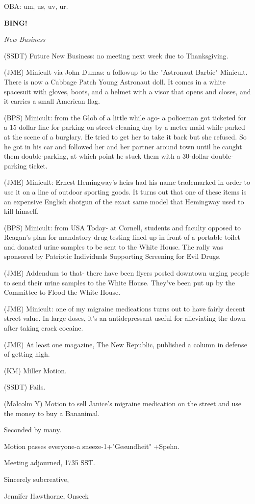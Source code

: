 \documentclass[12pt]{article}
\newcommand{\bing}{{\bf BING!} }
\newcommand{\goto}[1]{\bing \vskip 12pt \centerline{{\em{#1}}}}
\begin{document}
OBA: um, us, uv, ur.

\goto{New Business}

(SSDT) Future New Business: no meeting next week due to Thanksgiving.

(JME) Minicult via John Dumas: a followup to the "Astronaut Barbie" Minicult. There is now a Cabbage Patch Young Astronaut doll. It comes in a white spacesuit with gloves, boots, and a helmet with a visor that opens and closes, and it carries a small American flag.

(BPS) Minicult: from the Glob of a little while ago- a policeman got ticketed for a 15-dollar fine for parking on street-cleaning day by a meter maid while parked at the scene of a burglary. He tried to get her to take it back but she refused. So he got in his car and followed her and her partner around town until he caught them double-parking, at which point he stuck them with a 30-dollar double-parking ticket.

(JME) Minicult: Ernest Hemingway's heirs had his name trademarked in order to use it on a line of outdoor sporting goods. It turns out that one of these items is an expensive English shotgun of the exact same model that Hemingway used to kill himself.

(BPS) Minicult: from USA Today- at Cornell, students and faculty opposed to Reagan's plan for mandatory drug testing lined up in front of a portable toilet and donated urine samples to be sent to the White House. The rally was sponsored by Patriotic Individuals Supporting Screening for Evil Drugs.

(JME) Addendum to that- there have been flyers posted downtown urging people to send their urine samples to the White House. They've been put up by the Committee to Flood the White House.

(JME) Minicult: one of my migraine medications turns out to have fairly decent street value. In large doses, it's an antidepressant useful for alleviating the down after taking crack cocaine.

(JME) At least one magazine, The New Republic, published a column in defense of getting high.

(KM) Miller Motion.

(SSDT) Fails.

(Malcolm Y) Motion to sell Janice's migraine medication on the street and use the money to buy a Bananimal.

Seconded by many.

Motion passes everyone-a sneeze-1+"Gesundheit" +Spehn.

\vspace{12pt}

\noindent
Meeting adjourned, 1735 SST.

\vspace{18pt}

\centerline{Sincerely subcreative,}
\centerline{Jennifer Hawthorne, Onseck}
\end{document}
